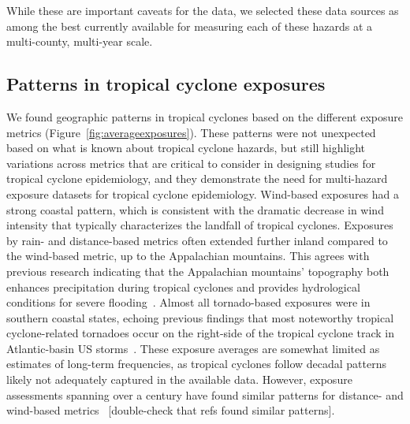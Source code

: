 \begin{comment}
[For discussion?] Based on these results, the two data sources were generally
in agreement, but the analysis highlights the difficulty of assessing
storm-related flooding at a multi-county, multi-year scale, as flooding can be
very localized within a county or can \ldots .   
\end{comment}

While these are important caveats for the data, we selected these data sources
as among the best currently available for measuring each of these hazards at a
multi-county, multi-year scale.

\subsection*{Patterns in tropical cyclone exposures}

We found geographic patterns in tropical cyclones based on the different
exposure metrics (Figure~\ref{fig:averageexposures}). These patterns were not
unexpected based on what is known about tropical cyclone hazards, but still
highlight variations across metrics that are critical to consider in designing
studies for tropical cyclone epidemiology, and they demonstrate the need for
multi-hazard exposure datasets for tropical cyclone epidemiology. Wind-based
exposures had a strong coastal pattern, which is consistent with the dramatic
decrease in wind intensity that typically characterizes the landfall of
tropical cyclones. Exposures by rain- and distance-based metrics often extended
further inland compared to the wind-based metric, up to the Appalachian
mountains. This agrees with previous research indicating that the Appalachian
mountains' topography both enhances precipitation during tropical cyclones and
provides hydrological conditions for severe flooding~\parencite{rees2001}.
Almost all tornado-based exposures were in southern coastal states, echoing
previous findings that most noteworthy tropical cyclone-related tornadoes occur
on the right-side of the tropical cyclone track in Atlantic-basin \ac{US}
storms~\parencite{moore2012}.  These exposure averages are somewhat limited as
estimates of long-term frequencies, as tropical cyclones follow decadal
patterns~\parencite{kossin2007more} likely not adequately captured in the
available data. However, exposure assessments spanning over a century have
found similar patterns for distance- and wind-based
metrics~\textcite{zandbergen2009, kruk2010} [double-check that refs found
similar patterns].

